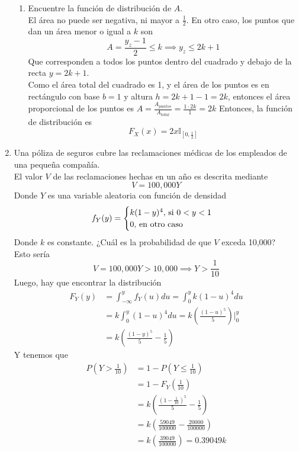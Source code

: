 \documentclass[12pt,a4paper]{report}
\begin{document}
\begin{enumerate}
{\begin{enumerate}
{				}
				\item {
					Encuentre la función de distribución de $A$.\\
					El área no puede ser negativa, ni mayor a $\frac{1}{2}$.
					En otro caso, los puntos que dan un área menor o igual a $k$
					son
					\[A = \frac{y_z-1}{2} \leq k \implies y_z \leq 2k + 1\]
					Que corresponden a todos los puntos dentro del cuadrado y
					debajo de la recta $y = 2k+1$.\\
					Como el área total del cuadrado es 1, y el área de los
					puntos es en rectángulo con base $b = 1$
					y altura $h = 2k+1-1 = 2k$, entonces el área proporcional de
					los puntos es
					$A = \frac{A_{puntos}}{A_{total}} = \frac{1 \cdot 2k}{1} = 2k$
					Entonces, la función de distribución es
					\[F_X(x) = 2x \mathbb{I}_{[0, \frac{1}{2}]}\]
				}
			\end{enumerate}
		}
		\item {
			Una póliza de seguros cubre las reclamaciones médicas de los empleados
			de una pequeña compañía.\\
			El valor $V$ de las reclamaciones hechas en un año es descrita mediante
			\[V = 100,000Y\]
			Donde $Y$ es una variable aleatoria con función de densidad
			\[
				f_Y(y) = \begin{cases}
							k(1-y)^4, $ si $ 0 < y < 1\\
							0, $ en otro caso$
						 \end{cases}
			\]
			Donde $k$ es constante. ¿Cuál es la probabilidad de que $V$ exceda 10,000?\\
			Esto sería
			\[V = 100,000Y > 10,000 \implies Y > \frac{1}{10}\]
			Luego, hay que encontrar la distribución
			\begin{align*}
				F_Y(y) &= \int_{-\infty}^{y}{f_Y(u)du} = \int_{0}^{y}{k(1-u)^4du}\\
					   &= k\int_{0}^{y}{(1-u)^4du} = k (\frac{(1-u)^5}{5})\Big|_0^y\\
					   &= k(\frac{(1-y)^5}{5} - \frac{1}{5})
			\end{align*}
			Y tenemos que
			\begin{align*}
				P(Y > \frac{1}{10}) &= 1 - P(Y \leq \frac{1}{10})\\
									&= 1 - F_Y(\frac{1}{10})\\
									&= k(\frac{(1-\frac{1}{10})^5}{5} - \frac{1}{5})\\
									&= k(\frac{59049}{100000} - \frac{20000}{100000})\\
									&= k(\frac{39049}{100000}) = 0.39049k

\end{align*}}
\end{enumerate}
\end{document}
